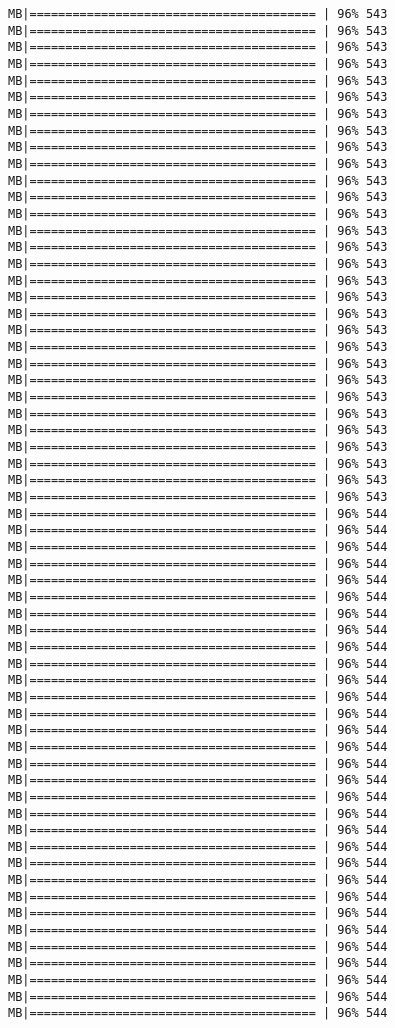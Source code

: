 \documentclass[
]{article}
\begin{document}
\begin{verbatim}
MB|======================================== | 96% 543 MB|======================================== | 96% 543 MB|======================================== | 96% 543 MB|======================================== | 96% 543 MB|======================================== | 96% 543 MB|======================================== | 96% 543 MB|======================================== | 96% 543 MB|======================================== | 96% 543 MB|======================================== | 96% 543 MB|======================================== | 96% 543 MB|======================================== | 96% 543 MB|======================================== | 96% 543 MB|======================================== | 96% 543 MB|======================================== | 96% 543 MB|======================================== | 96% 543 MB|======================================== | 96% 543 MB|======================================== | 96% 543 MB|======================================== | 96% 543 MB|======================================== | 96% 543 MB|======================================== | 96% 543 MB|======================================== | 96% 543 MB|======================================== | 96% 543 MB|======================================== | 96% 543 MB|======================================== | 96% 543 MB|======================================== | 96% 543 MB|======================================== | 96% 543 MB|======================================== | 96% 543 MB|======================================== | 96% 543 MB|======================================== | 96% 543 MB|======================================== | 96% 543 MB|======================================== | 96% 544 MB|======================================== | 96% 544 MB|======================================== | 96% 544 MB|======================================== | 96% 544 MB|======================================== | 96% 544 MB|======================================== | 96% 544 MB|======================================== | 96% 544 MB|======================================== | 96% 544 MB|======================================== | 96% 544 MB|======================================== | 96% 544 MB|======================================== | 96% 544 MB|======================================== | 96% 544 MB|======================================== | 96% 544 MB|======================================== | 96% 544 MB|======================================== | 96% 544 MB|======================================== | 96% 544 MB|======================================== | 96% 544 MB|======================================== | 96% 544 MB|======================================== | 96% 544 MB|======================================== | 96% 544 MB|======================================== | 96% 544 MB|======================================== | 96% 544 MB|======================================== | 96% 544 MB|======================================== | 96% 544 MB|======================================== | 96% 544 MB|======================================== | 96% 544 MB|======================================== | 96% 544 MB|======================================== | 96% 544 MB|======================================== | 96% 544 MB|======================================== | 96% 544 MB|======================================== | 96% 544 
\end{verbatim}
\end{document}
